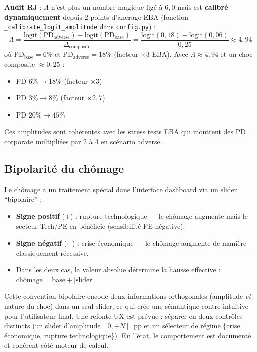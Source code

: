 \documentclass[12pt,a4paper]{article}
\begin{document}
\begin{interpretbox}
\textbf{Audit RJ} : $\Lambda$ n'est plus un nombre magique fig\'e \`a $6{,}0$ mais est
\textbf{calibr\'e dynamiquement} depuis 2 points d'ancrage EBA
(fonction \texttt{\_calibrate\_logit\_amplitude} dans \texttt{config.py}) :
\[
    \Lambda = \frac{\text{logit}(\text{PD}_{\text{adverse}}) - \text{logit}(\text{PD}_{\text{base}})}
                   {\Delta_{\text{composite}}}
    = \frac{\text{logit}(0{,}18) - \text{logit}(0{,}06)}{0{,}25} \approx 4{,}94
\]
o\`u $\text{PD}_{\text{base}} = 6\%$ et $\text{PD}_{\text{adverse}} = 18\%$ (facteur $\times 3$ EBA).
Avec $\Lambda \approx 4{,}94$ et un choc composite $\approx 0{,}25$ :
\begin{itemize}
    \item PD $6\% \to 18\%$ (facteur $\times 3$)
    \item PD $3\% \to 8\%$ (facteur $\times 2{,}7$)
    \item PD $20\% \to 45\%$
\end{itemize}
Ces amplitudes sont coh\'erentes avec les stress tests EBA qui montrent des PD corporate
multipli\'ees par 2 \`a 4 en sc\'enario adverse.
\end{interpretbox}

\subsection{Bipolarit\'e du ch\^omage}

Le ch\^omage a un traitement sp\'ecial dans l'interface dashboard via un slider ``bipolaire'' :
\begin{itemize}
    \item \textbf{Signe positif} ($+$) : rupture technologique --- le ch\^omage augmente mais le secteur Tech/PE en b\'en\'eficie (sensibilit\'e PE n\'egative).
    \item \textbf{Signe n\'egatif} ($-$) : crise \'economique --- le ch\^omage augmente de mani\`ere classiquement r\'ecessive.
    \item Dans les deux cas, la valeur absolue d\'etermine la hausse effective : $\text{ch\^omage} = \text{base} + |\text{slider}|$.
\end{itemize}

\begin{warningbox}
Cette convention bipolaire encode deux informations orthogonales (amplitude \textit{et} nature du choc)
dans un seul slider, ce qui cr\'ee une s\'emantique contre-intuitive pour l'utilisateur final.
Une refonte UX est pr\'evue : s\'eparer en deux contr\^oles distincts (un slider d'amplitude $[0, +N]$~pp
et un s\'electeur de r\'egime \{crise \'economique, rupture technologique\}).
En l'\'etat, le comportement est document\'e et coh\'erent c\^ot\'e moteur de calcul.
\end{warningbox}
\end{document}
